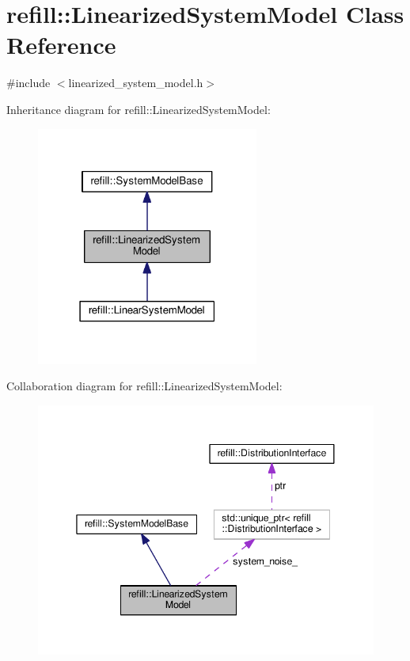 \hypertarget{classrefill_1_1LinearizedSystemModel}{}\section{refill\+:\+:Linearized\+System\+Model Class Reference}
\label{classrefill_1_1LinearizedSystemModel}


{\ttfamily \#include $<$linearized\+\_\+system\+\_\+model.\+h$>$}



Inheritance diagram for refill\+:\+:Linearized\+System\+Model\+:\nopagebreak
\begin{figure}[H]
\begin{center}
\leavevmode
\includegraphics[width=207pt]{classrefill_1_1LinearizedSystemModel__inherit__graph}
\end{center}
\end{figure}


Collaboration diagram for refill\+:\+:Linearized\+System\+Model\+:\nopagebreak
\begin{figure}[H]
\begin{center}
\leavevmode
\includegraphics[width=345pt]{classrefill_1_1LinearizedSystemModel__coll__graph}
\end{center}
\end{figure}
